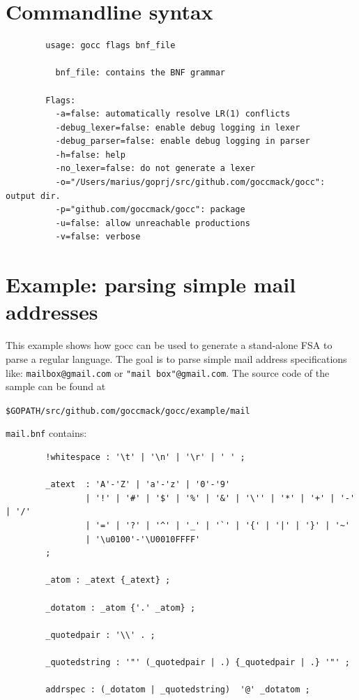 \documentclass[12pt]{article}
\begin{document}
\section{Commandline syntax}\label{sec:commandline}
	\begin{verbatim}
        usage: gocc flags bnf_file

          bnf_file: contains the BNF grammar

        Flags:
          -a=false: automatically resolve LR(1) conflicts
          -debug_lexer=false: enable debug logging in lexer
          -debug_parser=false: enable debug logging in parser
          -h=false: help
          -no_lexer=false: do not generate a lexer
          -o="/Users/marius/goprj/src/github.com/goccmack/gocc": output dir.
          -p="github.com/goccmack/gocc": package
          -u=false: allow unreachable productions
          -v=false: verbose
	\end{verbatim}

\section{Example: parsing simple mail addresses} \label{sec:example mail}
	This example shows how gocc can be used to generate a stand-alone FSA to parse a regular language. The goal is to parse simple mail address specifications like: \verb|mailbox@gmail.com| or \verb|"mail box"@gmail.com|. The source code of the sample can be found at

	\verb|$GOPATH/src/github.com/goccmack/gocc/example/mail|

	\verb|mail.bnf| contains:

	\begin{verbatim}
		!whitespace : '\t' | '\n' | '\r' | ' ' ;

		_atext  : 'A'-'Z' | 'a'-'z' | '0'-'9'
		        | '!' | '#' | '$' | '%' | '&' | '\'' | '*' | '+' | '-' | '/'
		        | '=' | '?' | '^' | '_' | '`' | '{' | '|' | '}' | '~'
		        | '\u0100'-'\U0010FFFF'
		;

		_atom : _atext {_atext} ;

		_dotatom : _atom {'.' _atom} ;

		_quotedpair : '\\' . ;

		_quotedstring : '"' (_quotedpair | .) {_quotedpair | .} '"' ;

		addrspec : (_dotatom | _quotedstring)  '@' _dotatom ;
	\end{verbatim}
\end{document}
